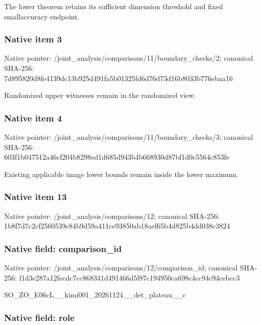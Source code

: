 \documentclass[10pt,a4paper]{article}
\begin{document}
The lower theorem retains its sufficient dimension threshold and fixed smallaccuracy endpoint.


\subsubsection{Native item 3}


Native pointer: /joint\_analysis/comparis\allowbreak{}ons/11/boundary\_checks/2; canonical SHA-256: 7d895820d8fe4139dc13b925\allowbreak{}d491fa5b01325fd6d76d73d1\allowbreak{}6b8033b776ebaa16


Randomized upper witnesses remain in the randomized view.


\subsubsection{Native item 4}


Native pointer: /joint\_analysis/comparis\allowbreak{}ons/11/boundary\_checks/3; canonical SHA-256: 603f1b047512a46cf204b829\allowbreak{}8ed1d685d943b4b668930d87\allowbreak{}bf1d0c5564c853fe


Existing applicable image lower bounds remain inside the lower maximum.


\subsubsection{Native item 13}


Native pointer: /joint\_analysis/comparisons/12; canonical SHA-256: 1b8f7d7c2cf2560539c84b9d\allowbreak{}59a411ce93850ab18aef65b4\allowbreak{}d825b4dd038c3824



\subsubsection{Native field: comparison\_id}


Native pointer: /joint\_analysis/comparis\allowbreak{}ons/12/comparison\_id; canonical SHA-256: f1d3e287a12fecdc7cc86834\allowbreak{}1d491466d5f87c194950ca69\allowbreak{}8c4cc94c94cebcc3


SO\_ZO\_E06cL\_\_kimi001\_202\allowbreak{}61124\_\_det\_plateau\_\_c


\subsubsection{Native field: role}
\end{document}
